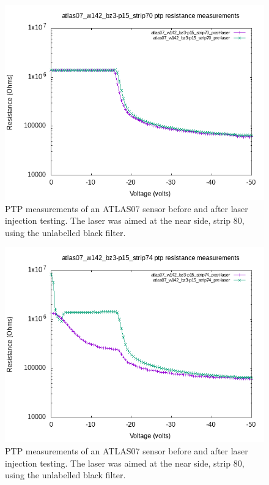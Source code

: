 \documentclass{report}
\begin{document}
            \begin{figure}[h] 
                \includegraphics[height=.4\textheight]{atlas07_w142_bz3-p15_strip70_resistance_plots}
                \centering
                \caption{ PTP measurements of an ATLAS07 sensor before and after laser injection testing. The laser was aimed at the near side, strip 80, using the unlabelled black filter. }
                \label{fig:atlas07_w142_bz3-p15_strip70_resistance_plots}
            \end{figure}

            \begin{figure}[h] 
                \includegraphics[height=.4\textheight]{atlas07_w142_bz3-p15_strip74_resistance_plots}
                \centering
                \caption{ PTP measurements of an ATLAS07 sensor before and after laser injection testing. The laser was aimed at the near side, strip 80, using the unlabelled black filter. }
                \label{fig:atlas07_w142_bz3-p15_strip74_resistance_plots}
            \end{figure}
\end{document}

